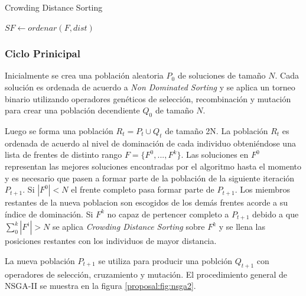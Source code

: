 \begin{algorithm*}[ht]
    \caption{Crowding Distance Sorting}
    \label{proposal:alg:cd}


    $SF \gets ordenar(F, dist)$ 
\end{algorithm*}

\subsubsection{Ciclo Prinicipal}
Inicialmente se crea una poblaci\'on aleatoria $P_0$ de soluciones de tama\~no $N$. Cada soluci\'on es ordenada de acuerdo a \textit{Non Dominated Sorting} y se aplica un torneo binario utilizando operadores gen\'eticos de selecci\'on, recombinaci\'on y mutaci\'on para crear una poblaci\'on decendiente $Q_0$ de tama\~no $N$.

Luego se forma una poblaci\'on $R_t = P_t \cup Q_t$ de tama\~no 2N. La poblaci\'on $R_t$ es ordenada de acuerdo al nivel de dominaci\'on de cada individuo obteni\'endose una lista de frentes de distinto rango $F = \{F^0, ..., F^k\}$. Las soluciones en $F^0$ representan las mejores soluciones encontradas por el algoritmo hasta el momento y es necesario que pasen a formar parte de la poblaci\'on de la siguiente iteraci\'on $P_{t+1}$. Si $|F^0| < N$ el frente completo pasa formar parte de $P_{t+1}$. Los miembros restantes de la nueva poblacion son escogidos de los dem\'as frentes acorde a su \'indice de dominaci\'on. Si $F^k$ no capaz de pertencer completo a $P_{t+1}$ debido a que $\sum_0^k |F^i| > N$ se aplica \textit{Crowding Distance Sorting} sobre $F^k$ y se llena las posiciones restantes con los individuos de mayor distancia.

La nueva poblaci\'on $P_{t+1}$ se utiliza para producir una poblci\'on $Q_{t+1}$ con operadores de selecci\'on, cruzamiento y mutaci\'on. El procedimiento general de NSGA-II se muestra en la figura \ref{proposal:fig:nsga2}.

